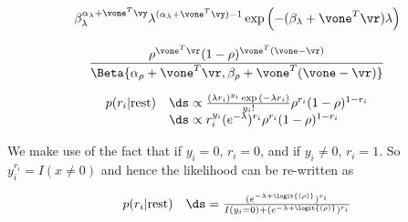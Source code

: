 %
%
%


$$
\beta_{\lambda}^{\alpha_\lambda+\vone^T\vy} \lambda^{(\alpha_\lambda + \vone^T\vy) - 1} \exp{\left(-(\beta_\lambda + \vone^T\vr) \lambda \right)}
$$

$$
\frac{\rho^{\vone^T\vr} (1 - \rho)^{\vone^T(\vone - \vr)}}{\Beta{\alpha_\rho + \vone^T \vr, \beta_\rho + \vone^T(\vone - \vr)}}
$$

$$
\begin{array}{ll}
	p(r_i | \text{rest}) & \ds \propto \frac{(\lambda r_i)^{y_i} \exp{(-\lambda r_i)}}{y_i !} \rho^{r_i} (1 - \rho)^{1 - r_i} \\
	                     & \ds \propto r_i^{y_i} (e^{-\lambda})^{r_i} \rho^{r_i} (1 - \rho)^{1 - r_i}                         
\end{array}
$$

We make use of the fact that if $y_i = 0$, $r_i = 0$, and if $y_i \ne 0$,
$r_i = 1$. So $y_i^{r_i} = I(x \ne 0)$ and hence the likelihood can be re-written as

$$
\begin{array}{ll}
	p(r_i | \text{rest}) & \ds = \frac{(e^{-\lambda + \logit{(\rho)}})^{r_i}}{I(y_i = 0) + (e^{-\lambda + \logit{(\rho)}})^{r_i}} 
\end{array}
$$
